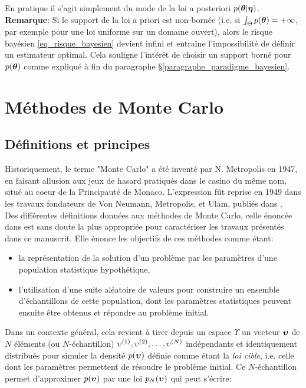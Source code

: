 En pratique il s'agit simplement du mode de la loi a posteriori ${p({\bm{\theta}} | {\bm{\eta}})}$.\\

\textbf{Remarque}: Si le support de la loi a priori est non-bornée (i.e. si $\int_{\Theta}p({\bm{\theta}}) = +\infty$, par exemple pour une loi uniforme sur un domaine ouvert), alors le risque bayésien \eqref{eq_risque_bayesien} devient infini et entraîne l'impossibilité de définir un estimateur optimal. Cela souligne l'intérêt de choisir un support borné pour $p({\bm{\theta}})$ comme expliqué à fin du paragraphe §\ref{paragraphe_paradigme_bayesien}.\\


\section{Méthodes de Monte Carlo}

\subsection{Définitions et principes}

Historiquement, le terme "Monte Carlo" a été inventé par N. Metropolis en 1947, en faisant allusion aux jeux de hasard pratiqués dans le casino du même nom, situé au coeur de la Principauté de Monaco. L'expression fût reprise en 1949 dans les travaux fondateurs de Von Neumann, Metropolis, et Ulam, publiés dans \cite{Metropolis1949}.\\

Des différentes définitions données aux méthodes de Monte Carlo, celle énoncée dans \cite{Halton1970} est sans doute la plus appropriée pour caractériser les travaux présentés dans ce manuscrit. Elle énonce les objectifs de ces méthodes comme étant: \\

\begin{itemize}
	\item la représentation de la solution d'un problème par les paramètres d'une population statistique hypothétique,
	\item l'utilisation d'une suite aléatoire de valeurs pour construire un ensemble d'échantillons de cette population, dont les paramètres statistiques peuvent ensuite être obtenus et répondre au problème initial.\\
\end{itemize}
	
Dans un contexte général, cela revient à tirer depuis un espace $\Upsilon$ un vecteur ${\bm{\upsilon}}$ de $N$ éléments (ou $N$-échantillon) ${\upsilon}^{(1)}, {\upsilon}^{(2)}, \dots, {\upsilon}^{(N)}$ indépendants et identiquement distribués pour simuler la densité $p({\bm{\upsilon}})$ définie comme étant la \textit{loi cible}, i.e. celle dont les paramètres permettent de résoudre le problème initial. Ce $N$-échantillon permet d'approximer $p({\bm{\upsilon}})$ par une loi $p_N({\bm{\upsilon}})$ qui peut s'écrire:

